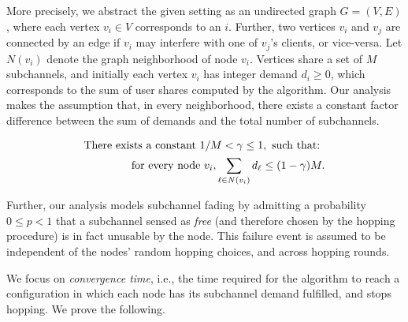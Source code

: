 More precisely, we abstract the given setting as an undirected graph $G = (V, E)$, where each vertex $v_i \in V$ corresponds to an \eNB $i$. 
Further, two vertices $v_i$ and $v_j$ are connected by an edge if $v_i$ may interfere with one of $v_j$'s clients, or vice-versa. 
Let $N(v_i)$ denote the graph neighborhood of node $v_i$. 
Vertices share a set of $M$ subchannels, and initially each vertex $v_i$ has integer demand $d_i \geq 0$, which corresponds to the sum of user shares computed by the algorithm. 
Our analysis makes the assumption that, in every neighborhood, there exists a constant factor difference between the sum of demands and the total number of  subchannels.

\begin{eqnarray*}
  \textnormal{There exists a constant } 1 / M < \gamma \leq 1, \textnormal{ such that: } \\ \textnormal{ for every node }  v_i, \sum_{\ell \in N(v_i)} d_\ell \leq (1 - \gamma) M.
\end{eqnarray*}

Further, our analysis models subchannel fading by admitting a probability $0 \leq p < 1$ that a subchannel sensed as \emph{free} (and therefore chosen by the hopping procedure) is in fact unusable by the node. 
This failure event is assumed to be independent of the nodes' random hopping choices, and across hopping rounds. 

We focus on \emph{convergence time}, i.e., the time required for the algorithm to reach a configuration in which each node has its subchannel demand fulfilled, and stops hopping. 
We prove the following. 

